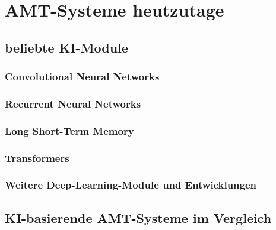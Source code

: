 \section{AMT-Systeme heutzutage}

\subsection{beliebte KI-Module}

\subsubsection{Convolutional Neural Networks}

\subsubsection{Recurrent Neural Networks}

\subsubsection{Long Short-Term Memory}

\subsubsection{Transformers}

\subsubsection{Weitere Deep-Learning-Module und Entwicklungen}


\subsection{KI-basierende AMT-Systeme im Vergleich}
